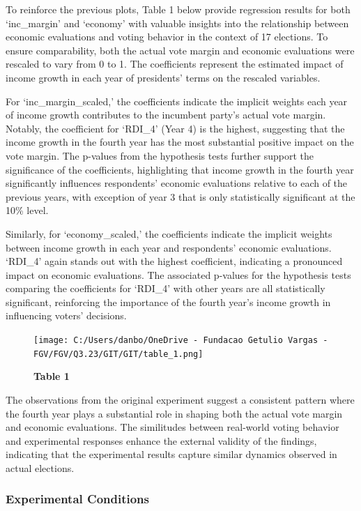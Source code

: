 \documentclass[
]{article}
\begin{document}
To reinforce the previous plots, Table 1 below provide regression
results for both `inc\_margin' and `economy' with valuable insights into
the relationship between economic evaluations and voting behavior in the
context of 17 elections. To ensure comparability, both the actual vote
margin and economic evaluations were rescaled to vary from 0 to 1. The
coefficients represent the estimated impact of income growth in each
year of presidents' terms on the rescaled variables.

For `inc\_margin\_scaled,' the coefficients indicate the implicit
weights each year of income growth contributes to the incumbent party's
actual vote margin. Notably, the coefficient for `RDI\_4' (Year 4) is
the highest, suggesting that the income growth in the fourth year has
the most substantial positive impact on the vote margin. The p-values
from the hypothesis tests further support the significance of the
coefficients, highlighting that income growth in the fourth year
significantly influences respondents' economic evaluations relative to
each of the previous years, with exception of year 3 that is only
statistically significant at the 10\% level.

Similarly, for `economy\_scaled,' the coefficients indicate the implicit
weights between income growth in each year and respondents' economic
evaluations. `RDI\_4' again stands out with the highest coefficient,
indicating a pronounced impact on economic evaluations. The associated
p-values for the hypothesis tests comparing the coefficients for
`RDI\_4' with other years are all statistically significant, reinforcing
the importance of the fourth year's income growth in influencing voters'
decisions.

\begin{figure}
\centering
\texttt{[image: C:/Users/danbo/OneDrive - Fundacao Getulio Vargas - FGV/FGV/Q3.23/GIT/GIT/table\_1.png]}
\caption{\textbf{Table 1}}
\end{figure}

The observations from the original experiment suggest a consistent
pattern where the fourth year plays a substantial role in shaping both
the actual vote margin and economic evaluations. The similitudes between
real-world voting behavior and experimental responses enhance the
external validity of the findings, indicating that the experimental
results capture similar dynamics observed in actual elections.

\hypertarget{experimental-conditions}{%
\subsubsection{Experimental Conditions}\label{experimental-conditions}}
\end{document}
